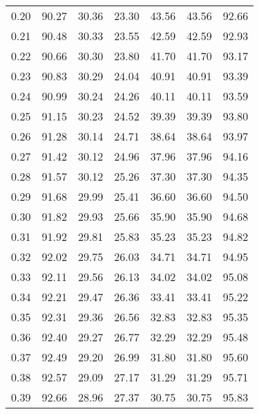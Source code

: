 \begin{tabular}{|c|c|c|c|c|c|c|}
      0.20 &     90.27 &     30.36 &      23.30 &   43.56 &      43.56 &         92.66 \\
      0.21 &     90.48 &     30.33 &      23.55 &   42.59 &      42.59 &         92.93 \\
      0.22 &     90.66 &     30.30 &      23.80 &   41.70 &      41.70 &         93.17 \\
      0.23 &     90.83 &     30.29 &      24.04 &   40.91 &      40.91 &         93.39 \\
      0.24 &     90.99 &     30.24 &      24.26 &   40.11 &      40.11 &         93.59 \\
      0.25 &     91.15 &     30.23 &      24.52 &   39.39 &      39.39 &         93.80 \\
      0.26 &     91.28 &     30.14 &      24.71 &   38.64 &      38.64 &         93.97 \\
      0.27 &     91.42 &     30.12 &      24.96 &   37.96 &      37.96 &         94.16 \\
      0.28 &     91.57 &     30.12 &      25.26 &   37.30 &      37.30 &         94.35 \\
      0.29 &     91.68 &     29.99 &      25.41 &   36.60 &      36.60 &         94.50 \\
      0.30 &     91.82 &     29.93 &      25.66 &   35.90 &      35.90 &         94.68 \\
      0.31 &     91.92 &     29.81 &      25.83 &   35.23 &      35.23 &         94.82 \\
      0.32 &     92.02 &     29.75 &      26.03 &   34.71 &      34.71 &         94.95 \\
      0.33 &     92.11 &     29.56 &      26.13 &   34.02 &      34.02 &         95.08 \\
      0.34 &     92.21 &     29.47 &      26.36 &   33.41 &      33.41 &         95.22 \\
      0.35 &     92.31 &     29.36 &      26.56 &   32.83 &      32.83 &         95.35 \\
      0.36 &     92.40 &     29.27 &      26.77 &   32.29 &      32.29 &         95.48 \\
      0.37 &     92.49 &     29.20 &      26.99 &   31.80 &      31.80 &         95.60 \\
      0.38 &     92.57 &     29.09 &      27.17 &   31.29 &      31.29 &         95.71 \\
      0.39 &     92.66 &     28.96 &      27.37 &   30.75 &      30.75 &         95.83 \\

\end{tabular}
